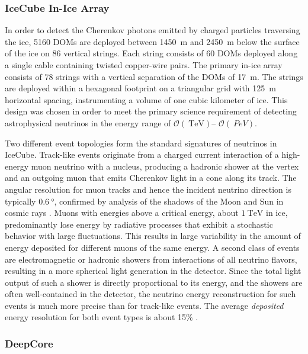 \subsubsection{IceCube In-Ice Array}

In order to detect the Cherenkov photons emitted by charged particles
traversing the ice, \num{5160} DOMs are deployed between \SI{1450}{\meter}
and \SI{2450} {\meter} below the surface of the ice on \num{86} vertical
strings. Each string consists of \num{60} DOMs deployed along a
single cable containing twisted copper-wire pairs. The 
primary in-ice array consists of \num{78} strings with a vertical
separation of the DOMs of \SI{17}{\meter}.  The strings are
deployed within a hexagonal footprint on a triangular grid with
\SI{125}{\meter} horizontal spacing, 
instrumenting a volume of one cubic kilometer of ice.  This design was chosen in
order to meet the primary science requirement of detecting astrophysical
neutrinos in the energy range of $\mathcal{O}(\SI{}{\tera\electronvolt})$--
$\mathcal{O}(\SI{}{PeV})$.  

Two different event topologies form the standard signatures of neutrinos in
IceCube.  Track-like events originate from a charged current interaction of
a high-energy muon neutrino with a nucleus, producing a hadronic shower at
the vertex and an outgoing muon that emits Cherenkov light in a cone along its
track.  The angular resolution for muon tracks and hence the incident
neutrino direction is typically $\SI{0.6}{\degree}$, confirmed by analysis
of the shadows of the Moon and Sun
in cosmic rays \cite{IC3:moon,IC3:sun}.  Muons with energies above a
critical energy, about $\SI{1}{\tera\electronvolt}$ in ice,
predominantly lose energy by radiative processes that exhibit a stochastic behavior with large fluctuations.  This results in
large variability in the amount of energy deposited 
for different muons of the same energy.  A second class of events are
electromagnetic or hadronic showers from interactions of all neutrino
flavors, resulting in a more spherical light generation in the detector.
Since the total light output of such a shower is directly proportional to its energy, and
the showers are often well-contained in the detector, the neutrino energy
reconstruction for such events is much more precise than for track-like
events. The average \emph{deposited} energy resolution for both event types
is about 15\% \cite{IC3:ereco}.

\subsubsection{DeepCore}

